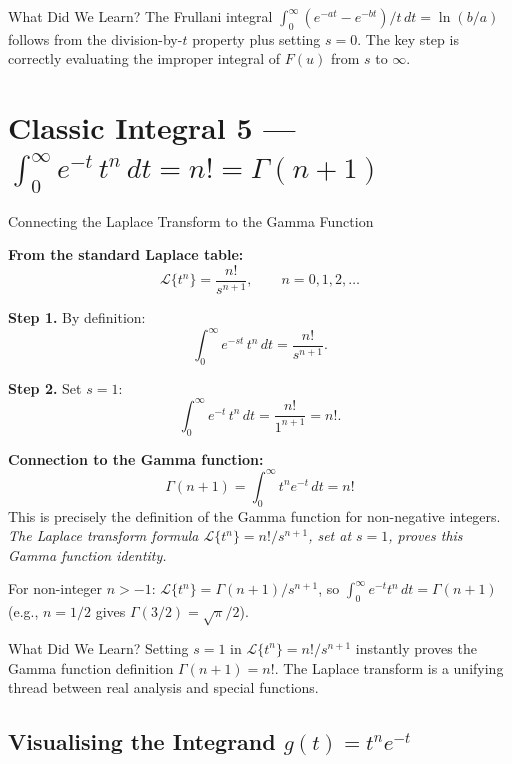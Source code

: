 \documentclass[12pt,a4paper]{article}
\begin{document}
\begin{learnbox}{What Did We Learn?}
The Frullani integral $\int_0^\infty (e^{-at}-e^{-bt})/t\,dt = \ln(b/a)$ follows
from the division-by-$t$ property plus setting $s = 0$. The key step is
correctly evaluating the improper integral of $F(u)$ from $s$ to $\infty$.
\end{learnbox}

\section{Classic Integral 5 --- $\int_0^\infty e^{-t}\, t^n\, dt = n! = \Gamma(n+1)$}

\begin{infobox}{Connecting the Laplace Transform to the Gamma Function}

\textbf{From the standard Laplace table:}
\[
  \mathcal{L}\{t^n\} = \frac{n!}{s^{n+1}}, \qquad n = 0, 1, 2, \ldots
\]

\textbf{Step 1.} By definition:
\[
  \int_0^\infty e^{-st}\, t^n\, dt = \frac{n!}{s^{n+1}}.
\]

\textbf{Step 2.} Set $s = 1$:
\[
  \int_0^\infty e^{-t}\, t^n\, dt = \frac{n!}{1^{n+1}} = n!.
\]

\textbf{Connection to the Gamma function:}
\[
  \Gamma(n+1) = \int_0^\infty t^n e^{-t}\, dt = n!
\]
This is precisely the definition of the Gamma function for non-negative integers.
\emph{The Laplace transform formula $\mathcal{L}\{t^n\} = n!/s^{n+1}$, set at
$s=1$, proves this Gamma function identity.}

For non-integer $n > -1$: $\mathcal{L}\{t^n\} = \Gamma(n+1)/s^{n+1}$, so
$\int_0^\infty e^{-t} t^n\, dt = \Gamma(n+1)$ (e.g., $n = 1/2$ gives
$\Gamma(3/2) = \sqrt{\pi}/2$).

\end{infobox}

\begin{learnbox}{What Did We Learn?}
Setting $s = 1$ in $\mathcal{L}\{t^n\} = n!/s^{n+1}$ instantly proves the Gamma
function definition $\Gamma(n+1) = n!$. The Laplace transform is a unifying
thread between real analysis and special functions.
\end{learnbox}

\subsection*{Visualising the Integrand $g(t) = t^n e^{-t}$}
\end{document}
